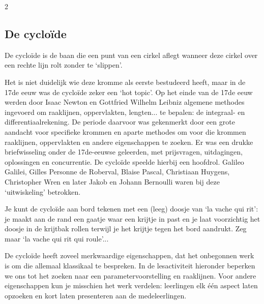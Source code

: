 \begin{multicols}{2}

\subsection{De cycloïde}

De cycloïde is de baan die een punt van een cirkel aflegt wanneer deze cirkel over een rechte lijn rolt zonder te `slippen'. 

Het is niet duidelijk wie deze kromme als eerste bestudeerd heeft, maar in de 17de eeuw was de cycloïde zeker een `hot topic'. Op het einde van de 17de eeuw werden door Isaac Newton en Gottfried Wilhelm Leibniz algemene methodes ingevoerd om raaklijnen, oppervlakten, lengten... te bepalen: de integraal- en differentiaalrekening. De periode daarvoor was gekenmerkt door een grote aandacht voor specifieke krommen en aparte methodes om voor die krommen raaklijnen, oppervlakten en andere eigenschappen te zoeken. Er was een drukke briefwisseling onder de 17de-eeuwse geleerden, met prijsvragen, uitdagingen, oplossingen en concurrentie. De cycloïde speelde hierbij een hoofdrol. Galileo Galilei, Gilles Personne de Roberval, Blaise Pascal, Christiaan Huygens, Christopher Wren en later Jakob en Johann Bernoulli waren bij deze `uitwiskeling' betrokken.


Je kunt de cycloïde aan bord tekenen met een (leeg) doosje van `la vache qui rit': je maakt aan de rand een gaatje waar een krijtje in past en je laat voorzichtig het doosje in de krijtbak rollen terwijl je het krijtje tegen het bord aandrukt. Zeg maar `la vache qui rit qui roule'...

De cycloïde heeft zoveel merkwaardige eigenschappen, dat het onbegonnen werk is om die allemaal klassikaal te bespreken. In de lesactiviteit hieronder beperken we ons tot het zoeken naar een parametervoorstelling en raaklijnen. Voor andere eigenschappen kun je misschien het werk verdelen: leerlingen elk één aspect laten opzoeken en kort laten presenteren aan de medeleerlingen. 

\end{multicols}


